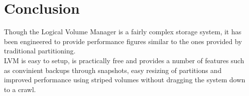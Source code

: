 \chapter{Conclusion}
Though the Logical Volume Manager is a fairly complex storage system, it has
been engineered to provide performance figures similar to the ones provided by
traditional partitioning.\\

LVM is easy to setup, is practically free and provides a number of features such
as convinient backups through snapshots, easy resizing of partitions and
improved performance using striped volumes without dragging the system down to
a crawl.
